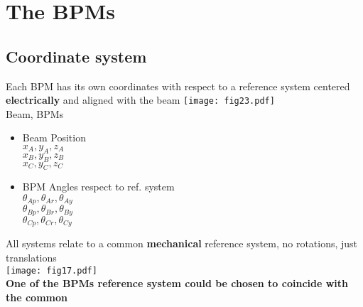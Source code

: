 \section{The BPMs}
\subsection{Coordinate system}\par
\centering
Each BPM has its own coordinates with respect to a reference system centered \textbf{electrically} and aligned with the beam
  \texttt{[image: fig23.pdf]}\\
  {\color{red}Beam}, {\color{forestgreen} BPMs}\\
\vspace{-3.3cm}
\begin{itemize}
 \item Beam Position
 \\$x_A,y_A,z_A$\\$x_B,y_B,z_B$\\$x_C,y_C,z_C$
 \item BPM Angles respect to ref. system\\
 $\theta_{Ap},\theta_{Ar},\theta_{Ay}$\\
 $\theta_{Bp},\theta_{Br},\theta_{By}$\\
 $\theta_{Cp},\theta_{Cr},\theta_{Cy}$
\end{itemize}
\centering
{\tiny All systems relate to a common \textbf{mechanical} reference system, no rotations, just translations}\\
\texttt{[image: fig17.pdf]}\\\centering
{\tiny \textbf{One of the BPMs reference system could be chosen to coincide with the common}\\
}

